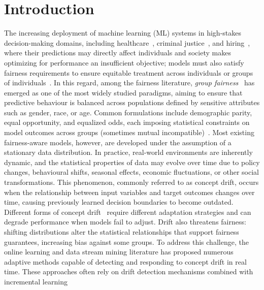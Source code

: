 \documentclass[sigconf,anonymous,review]{acmart}
\begin{document}
\maketitle

\section{Introduction}
The increasing deployment of machine learning (ML) systems in high-stakes decision-making domains, including healthcare~\cite{8474918}, criminal justice~\cite{10467221}, 
and hiring~\cite{10.1145/3351095.3372828}, where their predictions may directly affect individuals and society makes optimizing for performance an insufficient objective; 
models must also satisfy fairness requirements to ensure equitable treatment across individuals or groups of individuals~\cite{10.1145/3457607}. In this regard,  
among the fairness literature, \emph{group fairness}~\cite{10.1145/2090236.2090255} has emerged as one of the most widely studied paradigms, aiming to ensure that predictive behaviour is
balanced across populations defined by sensitive attributes such as gender, race, or age. Common formulations include demographic parity, equal 
opportunity, and equalized odds, each imposing statistical constraints on model outcomes across groups (sometimes mutual incompatible)~\cite{10.1145/2090236.2090255,NIPS2016_6a9659fe}.
Most existing fairness-aware models, however, are developed under the assumption of a stationary data distribution. In practice, 
real-world environments are inherently dynamic, and the statistical properties of data may evolve over time due to policy changes, behavioural 
shifts, seasonal effects, economic fluctuations, or other social transformations. This phenomenon, commonly referred to as concept drift, 
occurs when the relationship between input variables and target outcomes changes over time, causing previously learned decision boundaries to 
become outdated. Different forms of concept drift~\cite{DBLP:journals/corr/WebbHCNP15} require different adaptation strategies and can degrade performance when models fail to adjust. 
Drift also threatens fairness: shifting distributions alter the statistical relationships that support fairness guarantees, increasing bias against some groups.
To address this challenge, the online learning and data stream mining literature has proposed numerous adaptive methods capable of detecting and 
responding to concept drift in real time. These approaches often rely on drift detection mechanisms combined with incremental learning 
\end{document}
